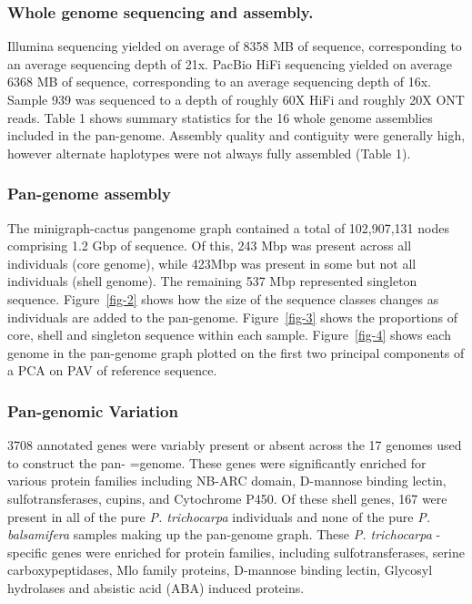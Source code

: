 \documentclass[
]{agujournal2019}
\begin{document}
\subsubsection{Whole genome sequencing and
assembly.}\label{whole-genome-sequencing-and-assembly.}

Illumina sequencing yielded on average of 8358 MB of sequence,
corresponding to an average sequencing depth of 21x. PacBio HiFi
sequencing yielded on average 6368 MB of sequence, corresponding to an
average sequencing depth of 16x. Sample 939 was sequenced to a depth of
roughly 60X HiFi and roughly 20X ONT reads. Table 1 shows summary
statistics for the 16 whole genome assemblies included in the
pan-genome. Assembly quality and contiguity were generally high, however
alternate haplotypes were not always fully assembled (Table 1).

\subsubsection{Pan-genome assembly}\label{pan-genome-assembly-1}

The minigraph-cactus pangenome graph contained a total of 102,907,131
nodes comprising 1.2 Gbp of sequence. Of this, 243 Mbp was present
across all individuals (core genome), while 423Mbp was present in some
but not all individuals (shell genome). The remaining 537 Mbp
represented singleton sequence. Figure~\ref{fig-2} shows how the size of
the sequence classes changes as individuals are added to the pan-genome.
Figure~\ref{fig-3} shows the proportions of core, shell and singleton
sequence within each sample. Figure~\ref{fig-4} shows each genome in the
pan-genome graph plotted on the first two principal components of a PCA
on PAV of reference sequence.

\subsubsection{Pan-genomic Variation}\label{pan-genomic-variation}

3708 annotated genes were variably present or absent across the 17
genomes used to construct the pan- =genome. These genes were
significantly enriched for various protein families including NB-ARC
domain, D-mannose binding lectin, sulfotransferases, cupins, and
Cytochrome P450. Of these shell genes, 167 were present in all of the
pure \emph{P. trichocarpa} individuals and none of the pure \emph{P.
balsamifera} samples making up the pan-genome graph. These \emph{P.
trichocarpa} - specific genes were enriched for protein families,
including sulfotransferases, serine carboxypeptidases, Mlo family
proteins, D-mannose binding lectin, Glycosyl hydrolases and absistic
acid (ABA) induced proteins.
\end{document}
